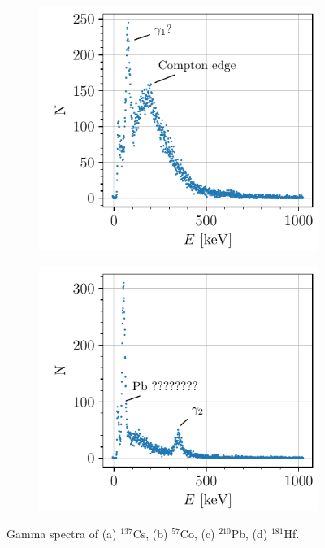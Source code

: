 \begin{figure}[htbp]
\begin{subfigure}{0.495\textwidth}
        \caption{}
    \end{subfigure}
    \begin{subfigure}{0.495\textwidth}
        \includegraphics[scale=1]{figures/pb210_spectrum.pdf}
        \caption{}
    \end{subfigure}
    \hfill
    \begin{subfigure}{0.495\textwidth}
        \includegraphics[scale=1]{figures/hf181_spectrum.pdf}
        \caption{}
    \end{subfigure}
    \caption{Gamma spectra of (a) $^{137}$Cs, (b) $^{57}$Co, (c) $^{210}$Pb, (d) $^{181}$Hf.}
    \label{fig:gamma_spectra}
\end{figure}


